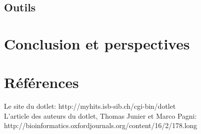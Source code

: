 \documentclass{report}
\begin{document}
\section{Outils}



\chapter*{Conclusion et perspectives}


\chapter*{Références}
Le site du dotlet: http://myhits.isb-sib.ch/cgi-bin/dotlet\\
L'article des auteurs du dotlet, Thomas Junier et Marco Pagni: http://bioinformatics.oxfordjournals.org/content/16/2/178.long\\
\end{document}
